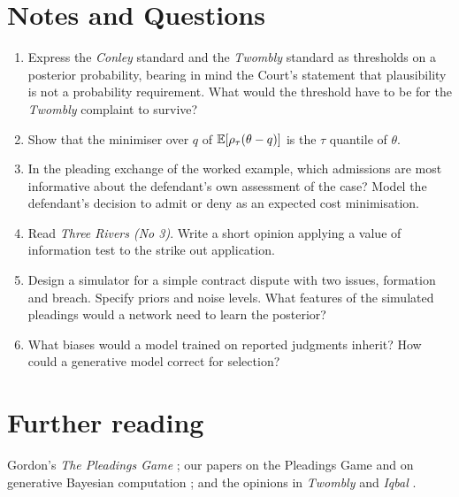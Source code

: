 \section*{Notes and Questions}
\begin{enumerate}[label=\arabic*.]
\item Express the \emph{Conley} standard and the \emph{Twombly} standard as thresholds on a posterior probability, bearing in mind the Court's statement that plausibility is not a probability requirement. What would the threshold have to be for the \emph{Twombly} complaint to survive?
\item Show that the minimiser over $q$ of $\mathbb{E}[\rho_\tau(\theta - q)]$ is the $\tau$ quantile of $\theta$.
\item In the pleading exchange of the worked example, which admissions are most informative about the defendant's own assessment of the case? Model the defendant's decision to admit or deny as an expected cost minimisation.
\item Read \emph{Three Rivers (No 3)}. Write a short opinion applying a value of information test to the strike out application.
\item Design a simulator for a simple contract dispute with two issues, formation and breach. Specify priors and noise levels. What features of the simulated pleadings would a network need to learn the posterior?
\item What biases would a model trained on reported judgments inherit? How could a generative model correct for selection?
\end{enumerate}

\section*{Further reading}
Gordon's \emph{The Pleadings Game} \citep{gordon1995}; our papers on the Pleadings Game and on generative Bayesian computation \citep{polson_sokolov_pleadings,polson_sokolov_gbc}; and the opinions in \emph{Twombly} and \emph{Iqbal} \citep{twombly2007,iqbal2009}.
